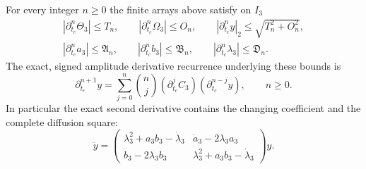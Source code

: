 \begin{theorem}\label{tgdc:all_orders}
For every integer $n\geq0$ the finite arrays above satisfy on $I_3$
\begin{equation}\label{tgdc:all_order_bounds}
\begin{gathered}
 |\partial_{t_c}^n\Theta_3|\leq T_n,\qquad
 |\partial_{t_c}^n\Omega_3|\leq O_n,\qquad
 |\partial_{t_c}^ny|_2\leq\sqrt{T_n^2+O_n^2},\\
 |\partial_{t_c}^na_3|\leq\mathfrak A_n,\qquad
 |\partial_{t_c}^nb_3|\leq\mathfrak B_n,\qquad
 |\partial_{t_c}^n\lambda_3|\leq\mathfrak D_n.
\end{gathered}
\end{equation}
The exact, signed amplitude derivative recurrence underlying these
bounds is
\begin{equation}\label{tgdc:exact_derivative_recurrence}
 \partial_{t_c}^{n+1}y
     =\sum_{j=0}^n\binom nj
            (\partial_{t_c}^jC_3)(\partial_{t_c}^{n-j}y),
 \qquad n\geq0.
\end{equation}
In particular the exact second derivative contains the changing
coefficient and the complete diffusion square:
\begin{equation}\label{tgdc:second_derivative}
 \ddot y=
 \begin{pmatrix}
 \lambda_3^2+a_3b_3-\dot\lambda_3&\dot a_3-2\lambda_3a_3\\
 \dot b_3-2\lambda_3b_3&\lambda_3^2+a_3b_3-\dot\lambda_3
 \end{pmatrix}y.
\end{equation}
\end{theorem}
